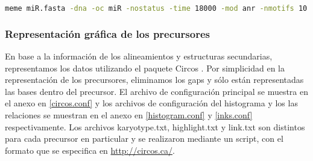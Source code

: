 \begin{lstlisting}[language=bash]
meme miR.fasta -dna -oc miR -nostatus -time 18000 -mod anr -nmotifs 10 -minw 5 -maxw 50 -revcomp -evt 1e-3
\end{lstlisting}

\subsubsection{Representación gráfica de los precursores}
En base a la información de los alineamientos y estructuras secundarias, representamos los datos utilizando el paquete Circos \citep{pmid19541911}.
Por simplicidad en la representación de los precursores, eliminamos los gaps y sólo están representadas las bases dentro del precursor. 
El archivo de configuración principal se muestra en el anexo en \ref{circos.conf} y los archivos de configuración del histograma y los las relaciones se muestran en el anexo en \ref{histogram.conf} y \ref{inks.conf} respectivamente. 
Los archivos karyotype.txt, highlight.txt y link.txt son distintos para cada precursor en particular y se realizaron mediante un script, con el formato que se especifica en \url{http://circos.ca/}.
